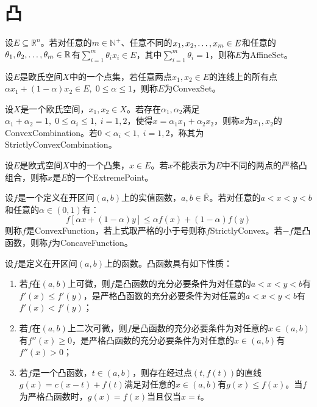 \chapter{凸}

\begin{definition}
	设$E\subseteq\mathbb{R}^{n}$。若对任意的$m\in\mathbb{N}^+$、任意不同的$x_1, x_2, \dots, x_{m}\in E$和任意的$\theta_1, \theta_2, \dots, \theta_{m}\in\mathbb{R}^{}$有$\sum\limits_{i=1}^{m}\theta_ix_i\in E$，其中$\sum\limits_{i=1}^{m}\theta_i=1$，则称$E$为\gls{AffineSet}。
\end{definition}
\begin{definition}
	设$E$是欧氏空间$X$中的一个点集，若任意两点$x_1,x_2\in E$的连线上的所有点$\alpha x_1+(1-\alpha)x_2\in E,\;0\leqslant\alpha\leqslant1$，则称$E$为\gls{ConvexSet}。
\end{definition}
\begin{definition}
	设$X$是一个欧氏空间，$x_1,x_2\in X$。若存在$\alpha_1,\alpha_2$满足$\alpha_1+\alpha_2=1,\;0\leqslant\alpha_i\leqslant1,\;i=1,2$，使得$x=\alpha_1x_1+\alpha_2x_2$，则称$x$为$x_1,x_2$的\gls{ConvexCombination}。若$0<\alpha_i<1,\;i=1,2$，称其为\gls{StrictlyConvexCombination}。
\end{definition}
\begin{definition}
	设$E$是欧式空间$X$中的一个凸集，$x\in E$。若$x$不能表示为$E$中不同的两点的严格凸组合，则称$x$是$E$的一个\gls{ExtremePoint}。
\end{definition}

\begin{definition}
	设$f$是一个定义在开区间$(a,b)$上的实值函数，$a,b\in\overline{\mathbb{R}^{}}$。若对任意的$a<x<y<b$和任意的$\alpha\in(0,1)$有：
	\begin{equation*}
		f[\alpha x+(1-\alpha)y]\leqslant\alpha f(x)+(1-\alpha)f(y)
	\end{equation*}
	则称$f$是\gls{ConvexFunction}，若上式取严格的小于号则称$f$\gls{StrictlyConvex}。若$-f$是凸函数，则称$f$为\gls{ConcaveFunction}。
\end{definition}
\begin{property}\label{prop:ConvexFunction}
	设$f$是定义在开区间$(a,b)$上的函数。凸函数具有如下性质：
	\begin{enumerate}
		\item 若$f$在$(a,b)$上可微，则$f$是凸函数的充分必要条件为对任意的$a<x<y<b$有$f'(x)\leqslant f'(y)$，是严格凸函数的充分必要条件为对任意的$a<x<y<b$有$f'(x)<f'(y)$；
		\item 若$f$在$(a,b)$上二次可微，则$f$是凸函数的充分必要条件为对任意的$x\in(a,b)$有$f''(x)\geqslant0$，是严格凸函数的充分必要条件为对任意的$x\in(a,b)$有$f''(x)>0$；
		\item 若$f$是一个凸函数，$t\in(a,b)$，则存在经过点$(t,f(t))$的直线$g(x)=c(x-t)+f(t)$满足对任意的$x\in(a,b)$有$g(x)\leqslant f(x)$。当$f$为严格凸函数时，$g(x)=f(x)$当且仅当$x=t$。
	\end{enumerate}
\end{property}

